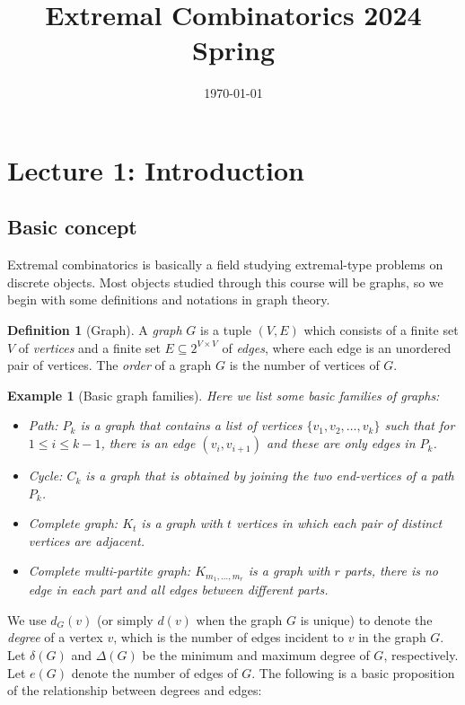 \documentclass{article}
\title{Extremal Combinatorics 2024 Spring}
\date{\today}
\newtheorem{example}[theorem]{Example}
\theoremstyle{definition}
\newtheorem{definition}[theorem]{Definition}
\begin{document}
\maketitle
\tableofcontents

\newpage

\setcounter{page}{1}

\section{Lecture 1: Introduction}

\subsection{Basic concept}

Extremal combinatorics is basically a field studying extremal-type problems on discrete objects. Most objects studied through this course will be graphs, so we begin with some definitions and notations in graph theory.

\begin{definition}[Graph]
    A \emph{graph} $G$ is a tuple $(V,E)$ which consists of a finite set $V$ of \emph{vertices} and a finite set $E\subseteq 2^{V\times V}$ of \emph{edges}, where each edge is an unordered pair of vertices. The \emph{order} of a graph $G$ is the number of vertices of $G$.
\end{definition}

\begin{example}[Basic graph families]
    Here we list some basic families of graphs:
    \begin{itemize}
        \item Path: $P_k$ is a graph that contains a list of vertices $\{ v_{1}, v_{2},\ldots,v_{k}\}$ such that for $1\leq i\leq k-1$, there is an edge $(v_{i},v_{i+1})$ and these are only edges in $P_k$.
        \item Cycle: $C_k$ is a graph that is obtained by joining the two end-vertices of a path $P_{k}$.
        \item Complete graph: $K_t$ is a graph with $t$ vertices in which each pair of distinct vertices are adjacent.
        \item Complete multi-partite graph: $K_{m_1,\ldots,m_r}$ is a graph with $r$ parts, there is no edge in each part and all edges between different parts.
    \end{itemize}
\end{example}

We use $d_{G}(v)$ (or simply $d(v)$ when the graph $G$ is unique) to denote the \emph{degree} of a vertex $v$, which is the number of edges incident to $v$ in the graph $G$. Let $\delta(G)$ and $\Delta(G)$ be the minimum and maximum degree of $G$, respectively. Let $e(G)$ denote the number of edges of $G$. The following is a basic proposition of the relationship between degrees and edges:
\end{document}
